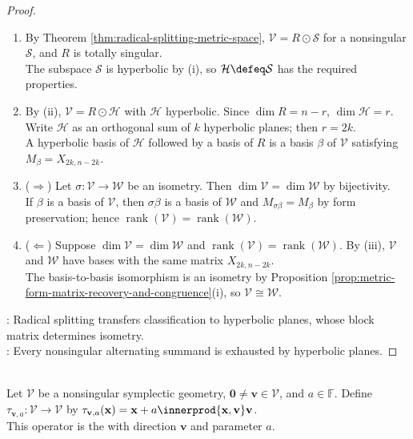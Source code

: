 \begin{theorem}
\begin{proof}
\begin{enumerate}[label=(\roman*)]
The complement $\mathcal{H}_1^{\perp}$ is hyperbolic by induction on $n$, so $\mathcal{V}$ is hyperbolic and $n$ is even.
\item[$(ii)$] By Theorem \ref{thm:radical-splitting-metric-space}, $\mathcal{V}=R\odot\mathcal{S}$ for a nonsingular $\mathcal{S}$, and $R$ is totally singular.\\
The subspace $\mathcal{S}$ is hyperbolic by (i), so $\mathcal{H}\defeq\mathcal{S}$ has the required properties.
\item[$(iii)$] By (ii), $\mathcal{V}=R\odot\mathcal{H}$ with $\mathcal{H}$ hyperbolic. Since $\dim R=n-r$, $\dim\mathcal{H}=r$.\\
Write $\mathcal{H}$ as an orthogonal sum of $k$ hyperbolic planes; then $r=2k$.\\
A hyperbolic basis of $\mathcal{H}$ followed by a basis of $R$ is a basis $\beta$ of $\mathcal{V}$ satisfying $M_{\beta}=X_{2k,n-2k}$.
\item[$(iv)$] ($\Rightarrow$) Let $\sigma:\mathcal{V}\to\mathcal{W}$ be an isometry. Then $\dim\mathcal{V}=\dim\mathcal{W}$ by bijectivity.\\
If $\beta$ is a basis of $\mathcal{V}$, then $\sigma\beta$ is a basis of $\mathcal{W}$ and $M_{\sigma\beta}=M_{\beta}$ by form preservation; hence $\operatorname{rank}(\mathcal{V})=\operatorname{rank}(\mathcal{W})$.
\item[$(iv)$] ($\Leftarrow$) Suppose $\dim\mathcal{V}=\dim\mathcal{W}$ and $\operatorname{rank}(\mathcal{V})=\operatorname{rank}(\mathcal{W})$. By (iii), $\mathcal{V}$ and $\mathcal{W}$ have bases with the same matrix $X_{2k,n-2k}$.\\
The basis-to-basis isomorphism is an isometry by Proposition \ref{prop:metric-form-matrix-recovery-and-congruence}(i), so $\mathcal{V}\cong\mathcal{W}$.
\end{enumerate}
: Radical splitting transfers classification to hyperbolic planes, whose block matrix determines isometry.\\
: Every nonsingular alternating summand is exhausted by hyperbolic planes.
\end{proof}
\end{theorem}

\begin{definition} \label{def:symplectic-transvection} \\
Let $\mathcal{V}$ be a nonsingular symplectic geometry, $\mathbf{0}\neq\mathbf{v}\in\mathcal{V}$, and $a\in\mathbb{F}$. Define $\tau_{\mathbf{v},a}:\mathcal{V}\to\mathcal{V}$ by $\tau_{\mathbf{v},a}(\mathbf{x})=\mathbf{x}+a\innerprod{\mathbf{x},\mathbf{v}}\mathbf{v}$.\\
This operator is the  with direction $\mathbf{v}$ and parameter $a$.
\end{definition}

